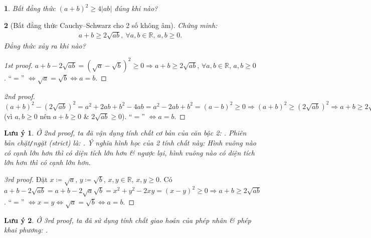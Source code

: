 \documentclass{article}
\newtheorem{baitoan}{}
\newtheorem{luuy}{Lưu ý}
\begin{document}
\begin{baitoan}
	Bất đẳng thức $(a + b)^2\ge4|ab|$ đúng khi nào?
\end{baitoan}

\begin{baitoan}[Bất đẳng thức Cauchy--Schwarz cho 2 số không âm]
	Chứng minh:
	\begin{align*}
		\boxed{a + b\ge2\sqrt{ab},\ \forall a,b\in\mathbb{R},\,a,b\ge 0.}
	\end{align*}
	Đẳng thức xảy ra khi nào?
\end{baitoan}

\begin{proof}[1st proof]
	$a + b - 2\sqrt{ab} = (\sqrt{a} - \sqrt{b})^2\ge0\Rightarrow a + b\ge2\sqrt{ab}$, $\forall a,b\in\mathbb{R}$, $a,b\ge 0$. ``$=$'' $\Leftrightarrow\sqrt{a} = \sqrt{b}\Leftrightarrow a = b$.
\end{proof}

\begin{proof}[2nd proof]
	$(a + b)^2 - (2\sqrt{ab})^2 = a^2 + 2ab + b^2 - 4ab = a^2 - 2ab + b^2 = (a - b)^2\ge0\Rightarrow(a + b)^2\ge(2\sqrt{ab})^2\Rightarrow a + b\ge2\sqrt{ab}$ (vì $a,b\ge0$ nên $a + b\ge0$ \& $2\sqrt{ab}\ge0$). ``$=$'' $\Leftrightarrow a = b$.
\end{proof}

\begin{luuy}
	Ở 2nd proof, ta đã vận dụng tính chất cơ bản của căn bậc 2: . Phiên bản chặt\emph{\texttt{/}}ngặt (strict) là: . Ý nghĩa hình học của 2 tính chất này: Hình vuông nào có cạnh lớn hơn thì có diện tích lớn hơn \& ngược lại, hình vuông nào có diện tích lớn hơn thì có cạnh lớn hơn.
\end{luuy}

\begin{proof}[3rd proof]
	Đặt $x\coloneqq\sqrt{a}$, $y\coloneqq\sqrt{b}$, $x,y\in\mathbb{R}$, $x,y\ge0$. Có $a + b - 2\sqrt{ab} = a + b - 2\sqrt{a}\sqrt{b} = x^2 + y^2 - 2xy = (x - y)^2\ge0\Rightarrow a + b\ge2\sqrt{ab}$. ``$=$'' $\Leftrightarrow x = y\Leftrightarrow\sqrt{a} = \sqrt{b}\Leftrightarrow a = b$.
\end{proof}

\begin{luuy}
	Ở 3rd proof, ta đã sử dụng tính chất giao hoán của phép nhân \& phép khai phương: .
\end{luuy}
\end{document}

